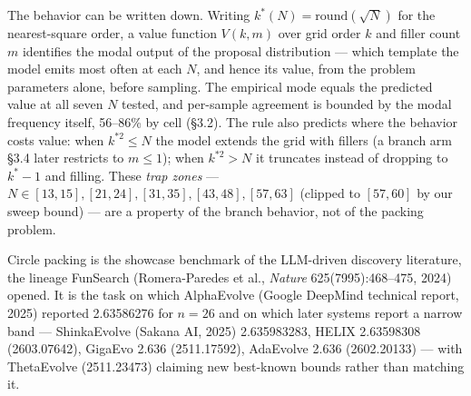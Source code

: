 \documentclass[11pt]{article}
\begin{document}
The behavior can be written down. Writing $k^{*}(N) = \mathrm{round}(\sqrt{N})$ for the nearest-square order, a
value function $V(k, m)$ over grid order $k$ and filler count $m$ identifies the modal output of the
proposal distribution --- which template the model emits most often at each $N$, and hence its
value, from the problem parameters alone, before sampling. The empirical mode equals the predicted value at
all seven $N$ tested, and per-sample agreement is bounded by the modal frequency itself, 56--86\%
by cell (\S3.2). The rule also predicts where the behavior costs value: when $k^{*2} \le N$ the model
extends the grid with fillers (a branch arm \S3.4 later restricts to $m \le 1$); when $k^{*2} > N$ it truncates instead of dropping to $k^{*}-1$ and
filling. These \textit{trap zones} --- $N \in [13,15], [21,24], [31,35], [43,48], [57,63]$ (clipped to
$[57,60]$ by our sweep bound) --- are a property of the branch behavior, not of the packing problem.

Circle packing is the showcase benchmark of the LLM-driven discovery literature, the lineage
FunSearch (Romera-Paredes et al., \textit{Nature} 625(7995):468--475, 2024) opened. It is the task on
which AlphaEvolve (Google DeepMind technical report, 2025) reported 2.63586276 for $n = 26$ and
on which later systems report a narrow band --- ShinkaEvolve (Sakana AI, 2025) 2.635983283, HELIX
2.63598308 (2603.07642), GigaEvo 2.636 (2511.17592), AdaEvolve 2.636 (2602.20133) --- with
ThetaEvolve (2511.23473) claiming new best-known bounds rather than matching it.
\end{document}
